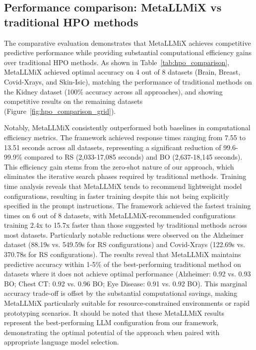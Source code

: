 \documentclass{article}
\begin{document}
\subsection{Performance comparison: MetaLLMiX vs traditional HPO methods}

The comparative evaluation demonstrates that MetaLLMiX achieves competitive predictive performance while providing substantial computational efficiency gains over traditional HPO methods. As shown in Table~\ref{tab:hpo_comparison}, MetaLLMiX achieved optimal accuracy on 4 out of 8 datasets (Brain, Breast, Covid-Xrays, and Skin-Isic), matching the performance of traditional methods on the Kidney dataset (100\% accuracy across all approaches), and showing competitive results on the remaining datasets (Figure~\ref{fig:hpo_comparison_grid}).

Notably, MetaLLMiX consistently outperformed both baselines in computational efficiency metrics. The framework achieved response times ranging from 7.55 to 13.51 seconds across all datasets, representing a significant reduction of 99.6-99.9\% compared to RS (2,033-17,085 seconds) and BO (2,637-18,145 seconds). This efficiency gain stems from the zero-shot nature of our approach, which eliminates the iterative search phases required by traditional methods.
Training time analysis reveals that MetaLLMiX tends to recommend lightweight model configurations, resulting in faster training despite this not being explicitly specified in the prompt instructions. The framework achieved the fastest training times on 6 out of 8 datasets, with MetaLLMiX-recommended configurations training 2.4x to 15.7x faster than those suggested by traditional methods across most datasets. Particularly notable reductions were observed on the Alzheimer dataset (88.19s vs. 549.59s for RS configurations) and Covid-Xrays (122.69s vs. 370.78s for RS configurations).
The results reveal that MetaLLMiX maintains predictive accuracy within 1-5\% of the best-performing traditional method on datasets where it does not achieve optimal performance (Alzheimer: 0.92 vs. 0.93 BO; Chest CT: 0.92 vs. 0.96 BO; Eye Disease: 0.91 vs. 0.92 BO). This marginal accuracy trade-off is offset by the substantial computational savings, making MetaLLMiX particularly suitable for resource-constrained environments or rapid prototyping scenarios.
It should be noted that these MetaLLMiX results represent the best-performing LLM configuration from our framework, demonstrating the optimal potential of the approach when paired with appropriate language model selection.
\end{document}

